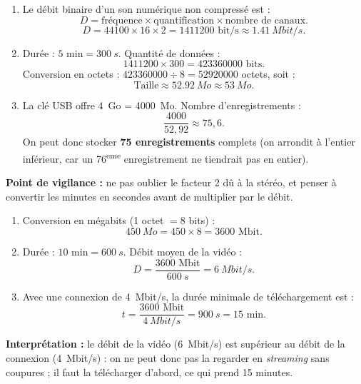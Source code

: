 \documentclass[11pt]{article}
\begin{document}
\begin{corrige}
\begin{enumerate}
\item Le débit binaire d'un son numérique non compressé est :
\[ D = \text{fréquence} \times \text{quantification} \times \text{nombre de canaux}. \]
\[ D = \num{44100} \times 16 \times 2 = \num{1411200} \text{ bit/s} \approx \SI{1,41}{Mbit/s}. \]
\item Durée : $5 \text{ min} = \SI{300}{s}$. Quantité de données :
\[ \num{1411200} \times 300 = \num{423360000} \text{ bits.} \]
Conversion en octets : $\num{423360000} \div 8 = \num{52920000}$ octets, soit :
\[ \text{Taille} \approx \SI{52,92}{Mo} \approx \SI{53}{Mo}. \]
\item La clé USB offre \SI{4}{Go} = \SI{4000}{Mo}. Nombre d'enregistrements :
\[ \frac{4000}{52,92} \approx 75,6. \]
On peut donc stocker \textbf{75 enregistrements} complets (on arrondit à l'entier inférieur, car un 76\textsuperscript{eme} enregistrement ne tiendrait pas en entier).
\end{enumerate}
\textbf{Point de vigilance :} ne pas oublier le facteur 2 dû à la stéréo, et penser à convertir les minutes en secondes avant de multiplier par le débit.
\end{corrige}

\begin{corrige}
\begin{enumerate}
\item Conversion en mégabits (1 octet $= 8$ bits) :
\[ \SI{450}{Mo} = 450 \times 8 = \num{3600} \text{ Mbit.} \]
\item Durée : $10 \text{ min} = \SI{600}{s}$. Débit moyen de la vidéo :
\[ D = \frac{\num{3600} \text{ Mbit}}{\SI{600}{s}} = \SI{6}{Mbit/s}. \]
\item Avec une connexion de \SI{4}{Mbit/s}, la durée minimale de téléchargement est :
\[ t = \frac{\num{3600} \text{ Mbit}}{\SI{4}{Mbit/s}} = \SI{900}{s} = 15 \text{ min.} \]
\end{enumerate}
\textbf{Interprétation :} le débit de la vidéo (\SI{6}{Mbit/s}) est supérieur au débit de la connexion (\SI{4}{Mbit/s}) : on ne peut donc pas la regarder en \emph{streaming} sans coupures ; il faut la télécharger d'abord, ce qui prend 15 minutes.
\end{corrige}
\end{document}
